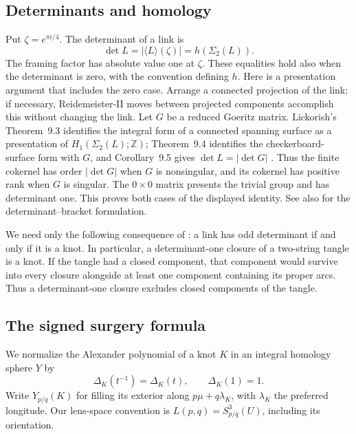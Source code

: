 \documentclass[11pt]{amsart}
\theoremstyle{definition}
\theoremstyle{remark}
\newcommand{\Z}{\mathbb Z}
\newcommand{\Det}{\operatorname{det}}
\newcommand{\br}[1]{\langle #1\rangle}
\begin{document}
\subsection{Determinants and homology}

Put \(\zeta=e^{\pi i/4}\). The determinant of a link is
\[
 \Det L=|\br L(\zeta)|
       =h(\Sigma_2(L)).
\]
The framing factor has absolute value one at \(\zeta\).
These equalities hold also when the determinant is zero, with
the convention defining \(h\).
Here is a presentation argument that includes the zero case.
Arrange a connected projection of the link; if necessary,
Reidemeister-II moves between projected components accomplish this
without changing the link. Let \(G\) be a reduced Goeritz matrix.
Lickorish's Theorem~9.3 identifies the integral form of a connected
spanning surface as a presentation of \(H_1(\Sigma_2(L);\Z)\);
Theorem~9.4 identifies the checkerboard-surface form with \(G\),
and Corollary~9.5 gives \(\Det L=|\det G|\)
\cite[Chapter~9, pp.~96--99]{LickorishBook}.
Thus the finite cokernel has order \(|\det G|\) when \(G\) is
nonsingular, and its cokernel has positive rank when \(G\) is
singular. The \(0\times0\) matrix presents the trivial group
and has determinant one. This proves both cases of the displayed
identity. See also \cite[Section~3]{DFKLS} for the
determinant--bracket formulation.

We need only the following consequence of
\cite[Proposition~6.5]{Stoimenow}: a link has odd determinant
if and only if it is a knot. In particular, a determinant-one
closure of a two-string tangle is a knot. If the tangle had
a closed component, that component would survive into every
closure alongside at least one component containing its
proper arcs. Thus a determinant-one closure excludes closed
components of the tangle.

\subsection{The signed surgery formula}

We normalize the Alexander polynomial of a knot \(K\) in an
integral homology sphere \(Y\) by
\[
 \Delta_K(t^{-1})=\Delta_K(t),\qquad \Delta_K(1)=1.
\]
Write \(Y_{p/q}(K)\) for filling its exterior along
\(p\mu+q\lambda_K\), with \(\lambda_K\) the preferred
longitude. Our lens-space convention is
\(L(p,q)=S^3_{p/q}(U)\), including its orientation.
\end{document}
